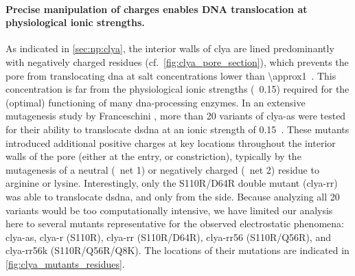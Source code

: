 \paragraph{Precise manipulation of charges enables DNA translocation at physiological ionic strengths.}
%
As indicated in \cref{sec:np:clya}, the interior walls of \gls{clya} are lined predominantly with negatively
charged residues (cf.~\cref{fig:clya_pore_section}), which prevents the pore from translocating \gls{dna} at
salt concentrations lower than \SI{\approx1}{\Molar}~\cite{Franceschini-2013,Franceschini-2016}. This
concentration is far from the physiological ionic strengths (\ie~\SI{0.15}{\Molar}) required for the (optimal)
functioning of many \gls{dna}-processing enzymes. In an extensive mutagenesis study by Franceschini \etal,
more than 20 variants of \gls{clya-as} were tested for their ability to translocate \gls{dsdna} at an ionic
strength of \SI{0.15}{\Molar}~\cite{Franceschini-2016}. These mutants introduced additional positive charges
at key locations throughout the interior walls of the pore (either at the \cisi{} entry, \lumen{} or \transi{}
constriction), typically by the mutagenesis of a neutral (\ie~net \SI{+1}{\ec}) or negatively charged (\ie~net
\SI{+2}{\ec}) residue to arginine or lysine. Interestingly, only the S110R/D64R double mutant (\gls{clya-rr})
was able to translocate \gls{dsdna}, and only from the \cisi{} side. Because analyzing all 20 variants would
be too computationally intensive, we have limited our analysis here to several mutants representative for the
observed electrostatic phenomena: \gls{clya-as}, \gls{clya-r} (S110R), \gls{clya-rr} (S110R/D64R),
\gls{clya-rr56} (S110R/Q56R), and \gls{clya-rr56k} (S110R/Q56R/Q8K). The locations of their mutations are
indicated in \cref{fig:clya_mutants_residues}.


